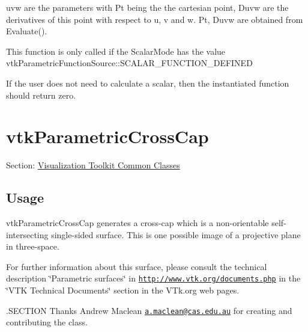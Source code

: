 \begin{DoxyItemize}
uvw are the parameters with Pt being the the cartesian point, Duvw are the derivatives of this point with respect to u, v and w. Pt, Duvw are obtained from Evaluate().

This function is only called if the Scalar\-Mode has the value vtk\-Parametric\-Function\-Source\-::\-S\-C\-A\-L\-A\-R\-\_\-\-F\-U\-N\-C\-T\-I\-O\-N\-\_\-\-D\-E\-F\-I\-N\-E\-D

If the user does not need to calculate a scalar, then the instantiated function should return zero.  
\end{DoxyItemize}\hypertarget{vtkcommon_vtkparametriccrosscap}{}\section{vtk\-Parametric\-Cross\-Cap}\label{vtkcommon_vtkparametriccrosscap}
Section\-: \hyperlink{sec_vtkcommon}{Visualization Toolkit Common Classes} \hypertarget{vtkwidgets_vtkxyplotwidget_Usage}{}\subsection{Usage}\label{vtkwidgets_vtkxyplotwidget_Usage}
vtk\-Parametric\-Cross\-Cap generates a cross-\/cap which is a non-\/orientable self-\/intersecting single-\/sided surface. This is one possible image of a projective plane in three-\/space.

For further information about this surface, please consult the technical description \char`\"{}\-Parametric surfaces\char`\"{} in \href{http://www.vtk.org/documents.php}{\tt http\-://www.\-vtk.\-org/documents.\-php} in the \char`\"{}\-V\-T\-K Technical Documents\char`\"{} section in the V\-Tk.\-org web pages.

.S\-E\-C\-T\-I\-O\-N Thanks Andrew Maclean \href{mailto:a.maclean@cas.edu.au}{\tt a.\-maclean@cas.\-edu.\-au} for creating and contributing the class.

